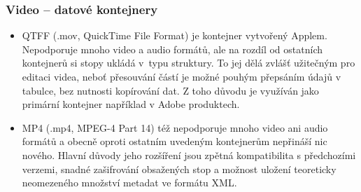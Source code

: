 \documentclass[aspectratio=169,11pt,svgnames]{beamer}
\begin{document}
\begin{frame}
 \frametitle{Video -- datové kontejnery}
 \begin{itemize}[label=\textbullet]
  \item \alert{QTFF} (.mov, QuickTime File Format) je kontejner vytvořený
   Applem. Nepodporuje mnoho video a audio formátů, ale na rozdíl od ostatních
   kontejnerů si stopy ukládá v~typu  struktury. To jej dělá zvlášť
   užitečným pro editaci videa, neboť přesouvání částí je možné pouhým přepsáním
   údajů v tabulce, bez nutnosti kopírování dat. Z toho důvodu je využíván jako
   primární kontejner například v Adobe produktech.
  \pause
  \item \alert{MP4} (.mp4, MPEG-4 Part 14) též nepodporuje mnoho video ani audio
   formátů a obecně oproti ostatním uvedeným kontejnerům nepřináší nic nového.
   Hlavní důvody jeho rozšíření jsou zpětná kompatibilita s předchozími verzemi,
   snadné zašifrování obsažených stop a možnost uložení teoreticky neomezeného
   množství metadat ve formátu XML.
 \end{itemize}
\end{frame}
\end{document}
